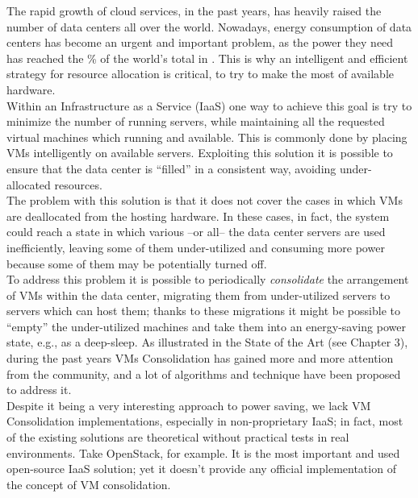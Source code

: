 

The rapid growth of cloud services, in the past years, has heavily raised the number of data centers all over the world. Nowadays, energy consumption of data centers has become an urgent and important problem, as the power they need has reached the \% of the world’s total in . This is why an intelligent and efficient strategy for resource allocation is critical, to try to make the most of available hardware.\\
Within an Infrastructure as a Service (IaaS) one way to achieve this goal is try to minimize the number of running servers, while maintaining all the requested virtual machines which running and available. This is commonly done by placing VMs intelligently on available servers.  Exploiting this solution it is possible to ensure that the data center is ``filled'' in a consistent way, avoiding under-allocated resources.\\
The problem with this solution is that it does not cover the cases in which VMs are deallocated from the hosting hardware. In these cases, in fact, the system could reach a state in which various --or all-- the data center servers are used inefficiently, leaving some of them under-utilized and consuming more power because some of them may be potentially turned off.\\
To address this problem it is possible to periodically \textit{consolidate} the arrangement of VMs within the data center, migrating them from under-utilized servers to servers which can host them; thanks to these migrations it might be possible to ``empty'' the under-utilized machines and take them into an energy-saving power state, e.g., as a deep-sleep. As illustrated in the State of the Art (see Chapter 3), during the past years VMs Consolidation has gained more and more attention from the community, and a lot of algorithms and technique have been proposed to address it.\\
Despite it being a very interesting approach to power saving, we lack VM Consolidation implementations, especially in non-proprietary IaaS; in fact, most of the existing solutions are theoretical without practical tests in real environments. Take OpenStack, for example. It is the most important and used open-source IaaS solution; yet it doesn’t provide any official implementation of the concept of VM consolidation.\\

